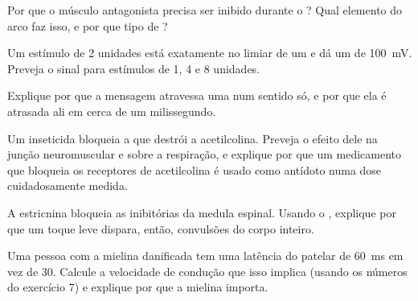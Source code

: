 \begin{exercise}[$\star\star$]\label{exo:g12:stretch-reflex:9}
Por que o músculo antagonista precisa ser inibido durante o ?
Qual elemento do arco faz isso, e por que tipo de ?
\end{exercise}

\begin{exercise}[$\star\star$]\label{exo:g12:stretch-reflex:10}
Um estímulo de 2 unidades está exatamente no limiar de um  e dá
um  de \qty{100}{mV}. Preveja o sinal para estímulos
de 1, 4 e 8 unidades.
\end{exercise}

\begin{exercise}[$\star\star$]\label{exo:g12:stretch-reflex:11}
Explique por que a mensagem atravessa uma  num sentido só, e por
que ela é atrasada ali em cerca de um milissegundo.
\end{exercise}

\begin{exercise}[$\star\star\star$]\label{exo:g12:stretch-reflex:12}
Um inseticida bloqueia a  que destrói a acetilcolina. Preveja o
efeito dele na junção neuromuscular e sobre a respiração, e explique
por que um medicamento que bloqueia os receptores de acetilcolina é
usado como antídoto numa dose cuidadosamente medida.
\end{exercise}

\begin{exercise}[$\star\star\star$]\label{exo:g12:stretch-reflex:13}
A estricnina bloqueia as  inibitórias da medula espinal. Usando
o , explique por que um toque leve dispara, então,
convulsões do corpo inteiro.
\end{exercise}

\begin{exercise}[$\star\star\star$]\label{exo:g12:stretch-reflex:14}
Uma pessoa com a mielina danificada tem uma latência do  patelar
de \qty{60}{ms} em vez de 30. Calcule a velocidade de condução que isso
implica (usando os números do exercício 7) e explique por que a mielina importa.
\end{exercise}

